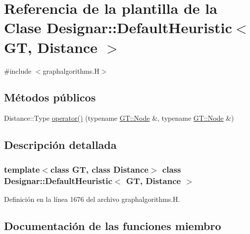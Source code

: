 \hypertarget{class_designar_1_1_default_heuristic}{}\section{Referencia de la plantilla de la Clase Designar\+:\+:Default\+Heuristic$<$ GT, Distance $>$}
\label{class_designar_1_1_default_heuristic}


{\ttfamily \#include $<$graphalgorithms.\+H$>$}

\subsection*{Métodos públicos}
\begin{DoxyCompactItemize}
\item 
Distance\+::\+Type \hyperlink{class_designar_1_1_default_heuristic_ab4a8fc009f9235163ac5696d166b287f}{operator()} (typename \hyperlink{test-mtreenode_8_c_a17a24b0725f59987143c5faf63c4dc6f}{G\+T\+::\+Node} \&, typename \hyperlink{test-mtreenode_8_c_a17a24b0725f59987143c5faf63c4dc6f}{G\+T\+::\+Node} \&)
\end{DoxyCompactItemize}


\subsection{Descripción detallada}
\subsubsection*{template$<$class GT, class Distance$>$\newline
class Designar\+::\+Default\+Heuristic$<$ G\+T, Distance $>$}



Definición en la línea 1676 del archivo graphalgorithms.\+H.



\subsection{Documentación de las funciones miembro}
\mbox{\label{class_designar_1_1_default_heuristic_ab4a8fc009f9235163ac5696d166b287f}} 
